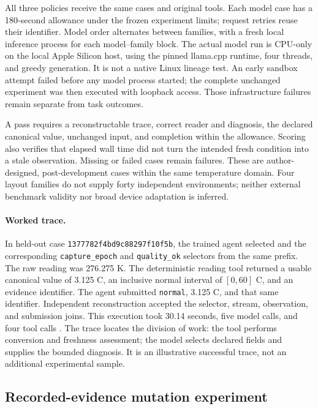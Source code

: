 \documentclass[11pt,letterpaper]{article}
\begin{document}
All three policies receive the same cases and original tools. Each model case
has a 180-second allowance under the frozen experiment limits; request retries
reuse their identifier. Model order alternates between families, with a fresh
local inference process for each model--family block. The actual model run is
CPU-only on the local Apple Silicon host, using the pinned llama.cpp runtime,
four threads, and greedy generation. It is not a native Linux lineage test.
An early sandbox attempt failed before any model process started; the complete
unchanged experiment was then executed with loopback access. Those infrastructure
failures remain separate from task outcomes.

A pass requires a reconstructable trace, correct reader and diagnosis, the
declared canonical value, unchanged input, and completion within the allowance.
Scoring also verifies that elapsed wall time did not turn the intended fresh
condition into a stale observation. Missing or failed cases remain failures.
These are author-designed, post-development cases within the same temperature
domain. Four layout families do not supply forty independent environments;
neither external benchmark validity nor broad device adaptation is inferred.

\paragraph{Worked trace.}
In held-out case \texttt{1377782f4bd9c88297f10f5b}, the trained agent selected
 and the corresponding
\texttt{capture\_epoch} and \texttt{quality\_ok} selectors from the same prefix.
The raw reading was 276.275 K. The deterministic reading tool returned a usable
canonical value of 3.125 C, an inclusive normal interval of $[0,60]$ C, and an
evidence identifier. The agent submitted \texttt{normal}, 3.125 C, and that
same identifier. Independent reconstruction accepted the selector, stream,
observation, and submission joins. This execution took 30.14 seconds, five model
calls, and four tool calls \cite{holdout}. The trace locates the division of
work: the tool performs conversion and freshness assessment; the model selects
declared fields and supplies the bounded diagnosis. It is an illustrative
successful trace, not an additional experimental sample.

\subsection{Recorded-evidence mutation experiment}
\end{document}
